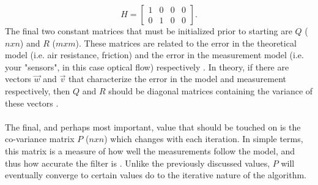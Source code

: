 \documentclass[12pt]{article} %
\begin{document}
\begin{equation}
H = \begin{bmatrix}
1 & 0 & 0 & 0 \\
0 & 1 & 0 & 0 
\end{bmatrix}.
\end{equation}
The final two constant matrices that must be initialized prior to starting are $Q$ ($nxn$) and $R$ ($mxm$). These matrices are related to the error in the theoretical model (i.e. air resistance, friction) and the error in the measurement model (i.e. your "sensors", in this case optical flow) respectively \cite{12}. In theory, if there are vectors $\vec{w}$ and $\vec{v}$ that characterize the error in the model and measurement respectively, then $Q$ and $R$ should be diagonal matrices containing the variance of these vectors \cite{4}. \\\\
The final, and perhaps most important, value that should be touched on is the co-variance matrix $P$ ($nxn$) which changes with each iteration. In simple terms, this matrix is a measure of how well the measurements follow the model, and thus how accurate the filter is \cite{12}. Unlike the previously discussed values, $P$ will eventually converge to certain values do to the iterative nature of the algorithm.
\end{document}

